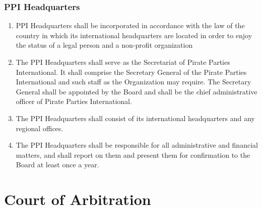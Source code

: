 \begin{frame}

\frametitle{PPI Headquarters}
\label{ppiheadquarters}

\begin{enumerate}
\item PPI Headquarters shall be incorporated in accordance with the law of the country in which its international headquarters are located in order to enjoy the status of a legal person and a non-{}profit organization

\item The PPI Headquarters shall serve as the Secretariat of Pirate Parties International. It shall comprise the Secretary General of the Pirate Parties International and such staff as the Organization may require. The Secretary General shall be appointed by the Board and shall be the chief administrative officer of Pirate Parties International.

\item The PPI Headquarters shall consist of its international headquarters and any regional offices.

\item The PPI Headquarters shall be responsible for all administrative and financial matters, and shall report on them and present them for confirmation to the Board at least once a year.

\end{enumerate}

\end{frame}

\section{Court of Arbitration}
\label{courtofarbitration}

